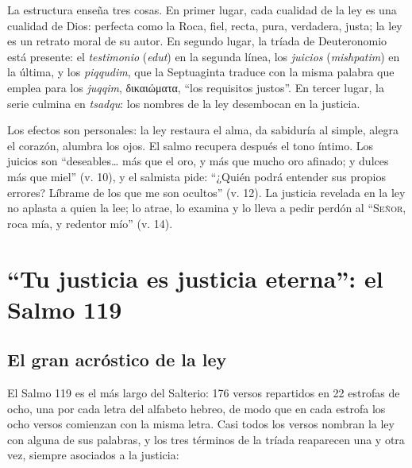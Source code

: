 \documentclass[11pt,letterpaper]{article}
\newcommand{\grc}[1]{\foreignlanguage{ancientgreek}{#1}}
\newcommand{\SENOR}{\textsc{Señor}}
\begin{document}
La estructura enseña tres cosas. En primer lugar, cada cualidad de la ley es una cualidad de Dios: perfecta como la Roca, fiel, recta, pura, verdadera, justa; la ley es un retrato moral de su autor. En segundo lugar, la tríada de Deuteronomio está presente: el \emph{testimonio} (\emph{edut}) en la segunda línea, los \emph{juicios} (\emph{mishpatim}) en la última, y los \emph{piqqudim}, que la Septuaginta traduce con la misma palabra que emplea para los \emph{juqqim}, \grc{δικαιώματα}, ``los requisitos justos''. En tercer lugar, la serie culmina en \emph{tsadqu}: los nombres de la ley desembocan en la justicia.

Los efectos son personales: la ley restaura el alma, da sabiduría al simple, alegra el corazón, alumbra los ojos. El salmo recupera después el tono íntimo. Los juicios son ``deseables\ldots{} más que el oro, y más que mucho oro afinado; y dulces más que miel'' (v. 10), y el salmista pide: ``¿Quién podrá entender sus propios errores? Líbrame de los que me son ocultos'' (v. 12). La justicia revelada en la ley no aplasta a quien la lee; lo atrae, lo examina y lo lleva a pedir perdón al ``\SENOR, roca mía, y redentor mío'' (v. 14).

\section{``Tu justicia es justicia eterna'': el Salmo 119}

\subsection{El gran acróstico de la ley}
El Salmo 119 es el más largo del Salterio: 176 versos repartidos en 22 estrofas de ocho, una por cada letra del alfabeto hebreo, de modo que en cada estrofa los ocho versos comienzan con la misma letra. Casi todos los versos nombran la ley con alguna de sus palabras, y los tres términos de la tríada reaparecen una y otra vez, siempre asociados a la justicia:
\end{document}
